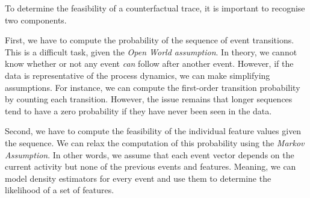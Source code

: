 \documentclass[./../../paper.tex]{subfiles}
\begin{document}
To determine the feasibility of a counterfactual trace, it is important to recognise two components. 

First, we have to compute the probability of the sequence of event transitions. This is a difficult task, given the \emph{Open World assumption}. In theory, we cannot know whether or not any event \emph{can} follow after another event. However, if the data is representative of the process dynamics, we can make simplifying assumptions. For instance, we can compute the first-order transition probability by counting each transition. However, the issue remains that longer sequences tend to have a zero probability if they have never been seen in the data. %

Second, we have to compute the feasibility of the individual feature values given the sequence. We can relax the computation of this probability using the \emph{Markov Assumption}. In other words, we assume that each event vector depends on the current activity but none of the previous events and features. Meaning, we can model density estimators for every event and use them to determine the likelihood of a set of features. 



\end{document}
